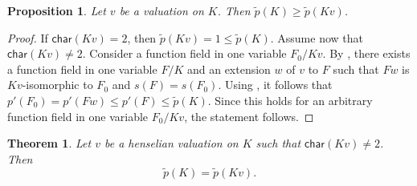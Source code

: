 \documentclass[12pt,leqno]{amsart}
\newcommand{\wt}[1]{\widetilde{{#1}}}
\newcommand{\car}{\mathsf{char}}
\renewcommand{\leq}{\leqslant}
\renewcommand{\geq}{\geqslant}
\numberwithin{equation}{section}
\newtheorem{thm}[equation]{Theorem}
\newtheorem{prop}[equation]{Proposition}
\theoremstyle{definition}
\theoremstyle{plain}
\begin{document}
\begin{prop}\label{P:wt-p-geq}
Let $v$ be a valuation on $K$. Then $\wt{p}(K)\geq \wt{p}(Kv)$.
\end{prop}
\begin{proof}
If $\car(Kv)=2$, then $\wt{p}(Kv)=1\leq \wt{p}(K)$.
Assume now that $\car(Kv)\neq 2$.
Consider a function field in one variable $F_0/Kv$.
By , there exists a function field in one variable $F/K$ and an extension $w$ of $v$ to $F$ such that $Fw$ is $Kv$-isomorphic to $F_0$ and $s(F)=s(F_0)$.
Using , it follows that $p'(F_0)=p'(Fw)\leq p'(F)\leq \wt{p}(K)$.
Since this holds for an arbitrary function field in one variable $F_0/Kv$, the statement follows.
\end{proof}


\begin{thm}\label{T:p-tilde-henselian-equality}
Let $v$ be a henselian valuation on $K$ such that $\car(Kv)\neq 2$.
Then \[\wt{p}(K)=\wt{p}(Kv).\]
\end{thm}
\end{document}
